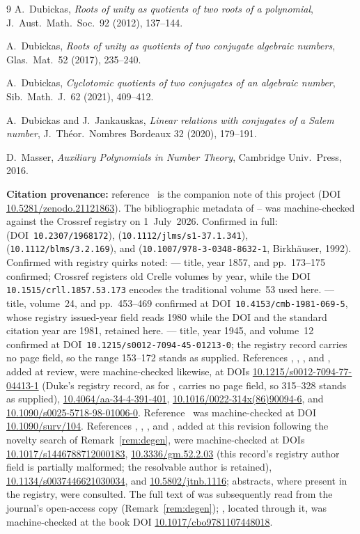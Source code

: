 \documentclass[11pt]{article}
\theoremstyle{plain}
\theoremstyle{definition}
\theoremstyle{remark}
\begin{document}
\begin{thebibliography}{9}
 A.~Dubickas, \emph{Roots of unity as quotients of two
roots of a polynomial}, J.~Aust.\ Math.\ Soc.\ 92 (2012), 137--144.

 A.~Dubickas, \emph{Roots of unity as quotients of two
conjugate algebraic numbers}, Glas.\ Mat.\ 52 (2017), 235--240.

 A.~Dubickas, \emph{Cyclotomic quotients of two
conjugates of an algebraic number}, Sib.\ Math.\ J.\ 62 (2021), 409--412.

 A.~Dubickas and J.~Jankauskas, \emph{Linear relations
with conjugates of a Salem number}, J.~Th\'eor.\ Nombres Bordeaux 32
(2020), 179--191.

 D.~Masser, \emph{Auxiliary Polynomials in Number Theory},
Cambridge Univ.\ Press, 2016.

\end{thebibliography}

\medskip
\noindent\textbf{Citation provenance:} reference~\cite{CMC} is the
companion note of this project (DOI \url{10.5281/zenodo.21121863}). The bibliographic metadata of
\cite{Kronecker}--\cite{Bertin} was machine-checked against the Crossref
registry on 1~July~2026. Confirmed in full: \cite{Lehmer}
(DOI~\texttt{10.2307/1968172}), \cite{Mahler}
(\texttt{10.1112/jlms/s1-37.1.341}), \cite{Smyth}
(\texttt{10.1112/blms/3.2.169}), and \cite{Bertin}
(\texttt{10.1007/978-3-0348-8632-1}, Birkh\"auser, 1992). Confirmed with
registry quirks noted: \cite{Kronecker} --- title, year 1857, and
pp.~173--175 confirmed; Crossref registers old Crelle volumes by year, while
the DOI \texttt{10.1515/crll.1857.53.173} encodes the traditional volume~53
used here. \cite{Boyd} --- title, volume~24, and pp.~453--469 confirmed at
DOI~\texttt{10.4153/cmb-1981-069-5}, whose registry issued-year field reads
1980 while the DOI and the standard citation year are 1981, retained here.
\cite{Salem} --- title, year 1945, and volume~12 confirmed at
DOI~\texttt{10.1215/s0012-7094-45-01213-0}; the registry record carries no
page field, so the range 153--172 stands as supplied. References
\cite{Boyd1977}, \cite{Dobrowolski}, \cite{Smyth1986}, and
\cite{Mossinghoff}, added at review, were machine-checked likewise, at DOIs
\url{10.1215/s0012-7094-77-04413-1} (Duke's registry record, as for
\cite{Salem}, carries no page field, so 315--328 stands as supplied),
\url{10.4064/aa-34-4-391-401}, \url{10.1016/0022-314x(86)90094-6}, and
\url{10.1090/s0025-5718-98-01006-0}. Reference~\cite{EPSW} was
machine-checked at DOI \url{10.1090/surv/104}. References \cite{Dub2012},
\cite{Dub2017}, \cite{Dub2021}, and \cite{DJ2020}, added at this revision
following the novelty search of Remark~\ref{rem:degen}, were machine-checked
at DOIs \url{10.1017/s1446788712000183}, \url{10.3336/gm.52.2.03} (this
record's registry author field is partially malformed; the resolvable
author is retained), \url{10.1134/s0037446621030034}, and
\url{10.5802/jtnb.1116}; abstracts, where present in the registry, were
consulted. The full text of \cite{Dub2017} was subsequently read from the
journal's open-access copy (Remark~\ref{rem:degen}); \cite{Masser}, located
through it, was machine-checked at the book DOI
\url{10.1017/cbo9781107448018}.
\end{document}
